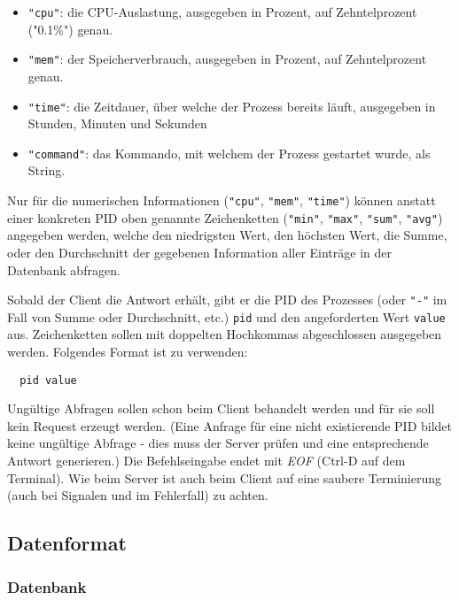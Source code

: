 \begin{itemize}
  \item \texttt{"{}cpu"{}}: die CPU-Auslastung, ausgegeben in Prozent, auf
    Zehntelprozent ("{}0.1\%"{}) genau.
  \item \texttt{"{}mem"{}}: der Speicherverbrauch, ausgegeben in Prozent, auf
    Zehntelprozent genau.
  \item \texttt{"{}time"{}}: die Zeitdauer, über welche der Prozess bereits
    läuft, ausgegeben in Stunden, Minuten und Sekunden
  \item \texttt{"{}command"{}}: das Kommando, mit welchem der Prozess
    gestartet wurde, als String.
\end{itemize}

Nur für die numerischen Informationen (\texttt{"{}cpu"{}}, \texttt{"{}mem"{}},
\texttt{"{}time"{}}) können anstatt einer konkreten PID oben genannte
Zeichenketten (\texttt{"{}min"}, \texttt{"{}max"}, \texttt{"{}sum"},
\texttt{"{}avg"}) angegeben werden, welche den niedrigsten Wert, den höchsten
Wert, die Summe, oder den Durchschnitt der gegebenen Information aller Einträge
in der Datenbank abfragen.

Sobald der Client die Antwort erhält, gibt er die PID des Prozesses (oder
\texttt{"{}-"{}} im Fall von Summe oder Durchschnitt, etc.) \texttt{pid} und
den angeforderten Wert \texttt{value} aus. Zeichenketten sollen mit doppelten
Hochkommas abgeschlossen ausgegeben werden. Folgendes Format ist zu verwenden:
\begin{verbatim}
  pid value
\end{verbatim}

%
Ungültige Abfragen sollen schon beim Client behandelt werden und für sie
soll kein Request erzeugt werden.
(Eine Anfrage für eine nicht existierende PID bildet keine ungültige Abfrage
- dies muss der Server prüfen und eine entsprechende Antwort generieren.)
%
Die Befehlseingabe endet mit \emph{EOF} (Ctrl-D auf dem Terminal).
Wie beim Server ist auch beim Client auf eine saubere Terminierung (auch bei
Signalen und im Fehlerfall) zu achten.



\subsection*{Datenformat}

\subsubsection*{Datenbank}

